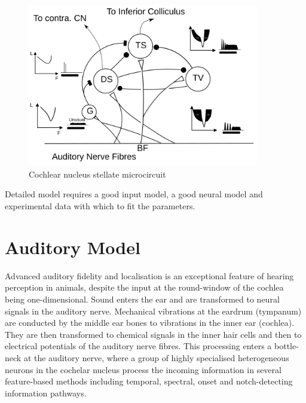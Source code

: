 \begin{figure}[htb]
  \centering
  \includegraphics[width=0.9\textwidth]{gfx/CNcircuit}
  \caption{Cochlear nucleus stellate microcircuit}
  \label{fig:microcircuit}
\end{figure}


\medskip{}

Detailed model requires a good input model, a good neural model and
experimental data with which to fit the parameters.  


\section{Auditory Model}

Advanced auditory fidelity and localisation is an exceptional feature
of hearing perception in animals, despite the input at the
round-window of the cochlea being one-dimensional.  Sound enters the
ear and are transformed to neural signals in the auditory
nerve. Mechanical vibrations at the eardrum (tympanum) are conducted
by the middle ear bones to vibrations in the inner ear (cochlea). They
are then transformed to chemical signals in the inner hair cells and
then to electrical potentials of the auditory nerve fibres. This
processing enters a bottle-neck at the auditory nerve, where a group
of highly specialised heterogeneous neurons in the cochelar nucleus
process the incoming information in several feature-based methods including temporal, spectral, onset and notch-detecting information pathways.

\medskip{}

